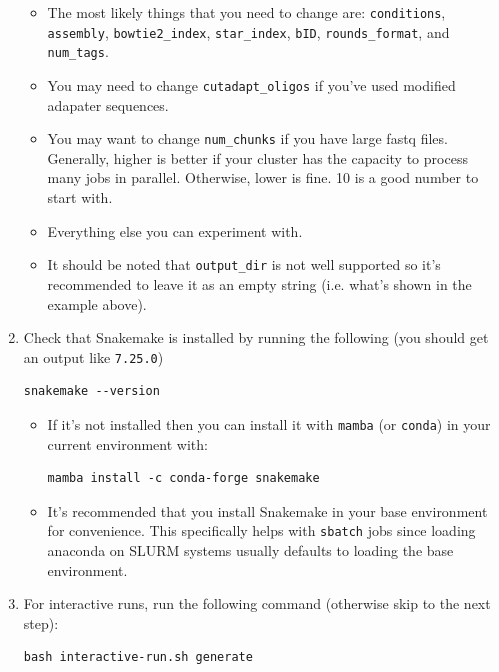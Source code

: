\documentclass{article}
\begin{document}
\begin{enumerate}
        \begin{itemize}
            \item The most likely things that you need to change are: \texttt{conditions}, \texttt{assembly}, \texttt{bowtie2\_index}, \texttt{star\_index}, \texttt{bID}, \texttt{rounds\_format}, and \texttt{num\_tags}.
            \item You may need to change \texttt{cutadapt\_oligos} if you've used modified adapater sequences.
            \item You may want to change \texttt{num\_chunks} if you have large fastq files. Generally, higher is better if your cluster has the capacity to process many jobs in parallel. Otherwise, lower is fine. 10 is a good number to start with.
            \item Everything else you can experiment with.
            \item It should be noted that \texttt{output\_dir} is not well supported so it's recommended to leave it as an empty string (i.e. what's shown in the example above).
        \end{itemize}

        \item Check that Snakemake is installed by running the following (you should get an output like \texttt{7.25.0})
        \begin{lstlisting}[style=bashstyle]
            snakemake --version
        \end{lstlisting}
        \begin{itemize}
            \item If it's not installed then you can install it with \texttt{mamba} (or \texttt{conda}) in your current environment with:
            \begin{lstlisting}[style=bashstyle]
                mamba install -c conda-forge snakemake
            \end{lstlisting}

            \item It's recommended that you install Snakemake in your base environment for convenience. This specifically helps with \texttt{sbatch} jobs since loading anaconda on SLURM systems usually defaults to loading the base environment.
        \end{itemize}

        \item For interactive runs, run the following command (otherwise skip to the next step):
        \begin{lstlisting}[style=bashstyle]
            bash interactive-run.sh generate
        \end{lstlisting}


\end{enumerate}
\end{document}
